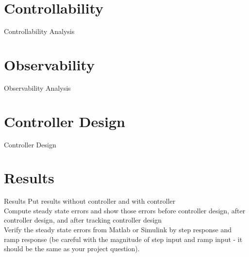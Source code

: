 \documentclass[10pt,compress,mathserif]{beamer}
\begin{document}
\section{Controllability}
\begin{frame}{Controllability Analysis}
\end{frame}


\section{Observability}
\begin{frame}{Observability Analysis}
\end{frame}


\section{Controller Design}
\begin{frame}{Controller Design}
\end{frame}


\section{Results}
\begin{frame}{Results}
Put results without controller and with controller \\ \vskip10pt
Compute steady state errors and show those errors before controller design, after controller design, and after tracking controller design \\ \vskip10pt
Verify the steady state errors from Matlab or Simulink by step response and ramp response (be careful with the magnitude of step input and ramp input - it should be the same as your project question).

\end{frame}
\end{document}
